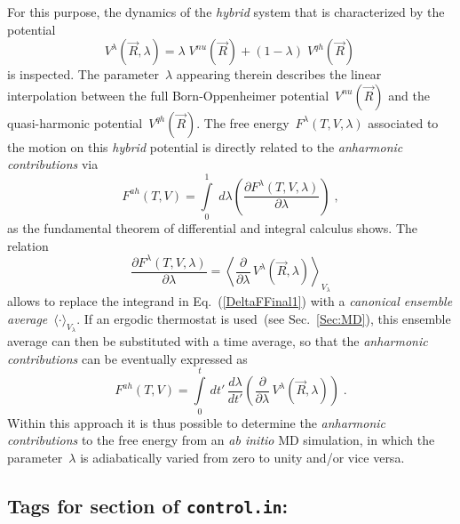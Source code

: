 For this purpose, the dynamics of the {\it hybrid} system that is characterized by the potential
\begin{equation}
V^{\lambda}(\vec{R},\lambda) = \lambda\; V^{nu}(\vec{R}) + (1-\lambda)\;V^{qh}(\vec{R}) \,
\label{DeltaHTI}
\end{equation}
is inspected. The parameter~$\lambda$ appearing therein describes the linear interpolation between 
the full Born-Oppenheimer potential~$V^{nu}(\vec{R})$ and the quasi-harmonic potential~$V^{qh}(\vec{R})$. 
The free energy~$F^{\lambda}(T,V,\lambda)$ associated to the motion on this \textit{hybrid} potential 
is directly related to the \textit{anharmonic contributions} via
\begin{equation}
F^{ah}(T,V) = \int\limits_{0}^{1}\;d\lambda \left(\frac{\partial F^{\lambda}(T,V,\lambda)}{\partial \lambda}  \right)\;,
\label{DeltaFFinal1}
\end{equation}
as the fundamental theorem of differential and integral calculus shows.
The relation~\cite{Vocadlo02}
\begin{equation}
\frac{\partial F^{\lambda}(T,V,\lambda)}{\partial \lambda} =  \left< \frac{\partial}{\partial \lambda}\,
V^{\lambda}(\vec{R},\lambda)\right>_{V_\lambda}
\end{equation}
allows to replace the integrand in Eq.~(\ref{DeltaFFinal1}) with a \textit{canonical ensemble 
average}~$\langle\cdot\rangle_{V_\lambda}$. If an ergodic thermostat is used~(see Sec.~\ref{Sec:MD}), 
this ensemble average can then be substituted with a time average, so that the 
\textit{anharmonic contributions} can be eventually expressed as~\cite{Vocadlo02}
\begin{equation}
F^{ah}(T,V) 
 =  \int\limits_0^t\,dt'\, \frac{d\lambda}{dt'}  \left( \frac{\partial }{\partial \lambda}\,
V^{\lambda}(\vec{R},\lambda)\right) \;.
\label{DeltaFFinal2}
\end{equation}
Within this approach it is thus possible to determine the \textit{anharmonic contributions} to the free energy 
from an \textit{ab initio} MD simulation, in which the parameter~$\lambda$ is adiabatically varied from zero 
to unity and/or vice versa.

\subsection*{Tags for  section of \texttt{control.in}:}

